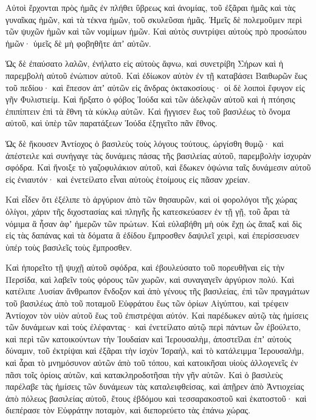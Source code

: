 {Αὐτοὶ ἔρχονται πρὸς ἡμᾶς ἐν πλήθει ὕβρεως καὶ ἀνομίας, τοῦ ἐξᾶραι ἡμᾶς καὶ τὰς γυναῖκας ἡμῶν, καὶ τὰ τέκνα ἡμῶν, τοῦ σκυλεῦσαι ἡμᾶς.
Ἡμεῖς δὲ πολεμοῦμεν περὶ τῶν ψυχῶν ἡμῶν καὶ τῶν νομίμων ἡμῶν.
Καὶ αὐτὸς συντρίψει αὐτοὺς πρὸ προσώπου ἡμῶν· ὑμεῖς δὲ μὴ φοβηθῆτε ἀπʼ αὐτῶν.
\par }{\PP {}Ὡς δὲ ἐπαύσατο λαλῶν, ἐνήλατο εἰς αὐτοὺς ἄφνω, καὶ συνετρίβη Σήρων καὶ ἡ παρεμβολὴ αὐτοῦ ἐνώπιον αὐτοῦ.
Καὶ ἐδίωκον αὐτὸν ἐν τῇ καταβάσει Βαιθωρῶν ἕως τοῦ πεδίου· καὶ ἔπεσον ἀπʼ αὐτῶν εἰς ἄνδρας ὀκτακοσίους· οἱ δὲ λοιποὶ ἔφυγον εἰς γῆν Φυλιστιείμ.
Καὶ ἤρξατο ὁ φόβος Ἰούδα καὶ τῶν ἀδελφῶν αὐτοῦ καὶ ἡ πτόησις ἐπιπίπτειν ἐπὶ τὰ ἔθνη τὰ κύκλῳ αὐτῶν.
Καὶ ἤγγισεν ἕως τοῦ βασιλέως τὸ ὄνομα αὐτοῦ, καὶ ὑπὲρ τῶν παρατάξεων Ἰούδα ἐξηγεῖτο πᾶν ἔθνος.
\par }{\PP {}Ὡς δὲ ἤκουσεν Ἀντίοχος ὁ βασιλεὺς τοὺς λόγους τούτους, ὠργίσθη θυμῷ· καὶ ἀπέστειλε καὶ συνήγαγε τὰς δυνάμεις πάσας τῆς βασιλείας αὐτοῦ, παρεμβολὴν ἰσχυρὰν σφόδρα.
Καὶ ἤνοιξε τὸ γαζοφυλάκιον αὐτοῦ, καὶ ἔδωκεν ὀψώνια ταῖς δυνάμεσιν αὐτοῦ εἰς ἐνιαυτόν· καὶ ἐνετείλατο εἶναι αὐτοὺς ἑτοίμους εἰς πᾶσαν χρείαν.
\par }{\PP {}Καὶ εἶδεν ὅτι ἐξέλιπε τὸ ἀργύριον ἀπὸ τῶν θησαυρῶν, καὶ οἱ φορολόγοι τῆς χώρας ὀλίγοι, χάριν τῆς διχοστασίας καὶ πληγῆς ἧς κατεσκεύασεν ἐν τῇ γῇ, τοῦ ἆραι τὰ νόμιμα ἃ ἦσαν ἀφʼ ἡμερῶν τῶν πρώτων.
Καὶ εὐλαβήθη μὴ οὐκ ἔχῃ ὡς ἅπαξ καὶ δὶς εἰς τὰς δαπάνας καὶ τὰ δόματα ἃ ἐδίδου ἔμπροσθεν δαψιλεῖ χειρὶ, καὶ ἐπερίσσευσεν ὑπέρ τοὺς βασιλεῖς τοὺς ἔμπροσθεν.
\par }{\PP {}Καὶ ἠπορεῖτο τῇ ψυχῇ αὐτοῦ σφόδρα, καὶ ἐβουλεύσατο τοῦ πορευθῆναι εἰς τὴν Περσίδα, καὶ λαβεῖν τοὺς φόρους τῶν χωρῶν, καὶ συναγαγεῖν ἀργύριον πολύ.
Καὶ κατέλιπε Λυσίαν ἄνθρωπον ἔνδοξον καὶ ἀπὸ γένους τῆς βασιλείας, ἐπὶ τῶν πραγμάτων τοῦ βασιλέως ἀπὸ τοῦ ποταμοῦ Εὐφράτου ἕως τῶν ὁρίων Αἰγύπτου,
καὶ τρέφειν Ἀντίοχον τὸν υἱὸν αὐτοῦ ἕως τοῦ ἐπιστρέψαι αὐτόν.
Καὶ παρέδωκεν αὐτῷ τὰς ἡμίσεις τῶν δυνάμεων καὶ τοὺς ἐλέφαντας· καὶ ἐνετείλατο αὐτῷ περὶ πάντων ὧν ἐβούλετο, καὶ περὶ τῶν κατοικούντων τὴν Ἰουδαίαν καὶ Ἱερουσαλὴμ,
ἀποστεῖλαι ἐπʼ αὐτοὺς δύναμιν, τοῦ ἐκτρίψαι καὶ ἐξᾶραι τὴν ἰσχὺν Ἰσραὴλ, καὶ τὸ κατάλειμμα Ἱερουσαλὴμ, καὶ ἆραι τὸ μνημόσυνον αὐτῶν ἀπὸ τοῦ τόπου,
καὶ κατοικῆσαι υἱοὺς ἀλλογενεῖς ἐν πᾶσι τοῖς ὁρίοις αὐτῶν, καὶ κατακληροδοτῆσαι τὴν γῆν αὐτῶν.
Καὶ ὁ βασιλεὺς παρέλαβε τὰς ἡμίσεις τῶν δυνάμεων τὰς καταλειφθείσας, καὶ ἀπῇρεν ἀπὸ Ἀντιοχείας ἀπὸ πόλεως βασιλείας αὐτοῦ, ἔτους ἑβδόμου καὶ τεσσαρακοστοῦ καὶ ἑκατοστοῦ· καὶ διεπέρασε τὸν Εὐφράτην ποταμὸν, καὶ διεπορεύετο τὰς ἐπάνω χώρας.
}
